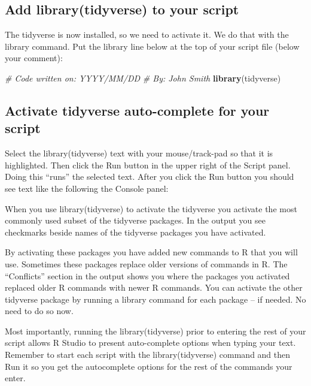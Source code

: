 \documentclass[
]{krantz}
\makeatletter
\newenvironment{Shaded}{\begin{snugshade}}{\end{snugshade}}
\newcommand{\CommentTok}[1]{\textcolor[rgb]{0.37,0.37,0.37}{\textit{#1}}}
\newcommand{\KeywordTok}[1]{\textcolor[rgb]{0.27,0.27,0.27}{\textbf{#1}}}
\newcommand{\NormalTok}[1]{#1}
\newenvironment{kframe}{%
\medskip{}
\setlength{\fboxsep}{.8em}
 \def\at@end@of@kframe{}%
 \ifinner\ifhmode%
  \def\at@end@of@kframe{\end{minipage}}%
  \begin{minipage}{\columnwidth}%
 \fi\fi%
 \def\FrameCommand##1{\hskip\@totalleftmargin \hskip-\fboxsep
 \colorbox{shadecolor}{##1}\hskip-\fboxsep
     \hskip-\linewidth \hskip-\@totalleftmargin \hskip\columnwidth}%
 \MakeFramed {\advance\hsize-\width
   \@totalleftmargin\z@ \linewidth\hsize
   \@setminipage}}%
 {\par\unskip\endMakeFramed%
 \at@end@of@kframe}
\renewenvironment{Shaded}{\begin{kframe}}{\end{kframe}}
\makeatother
\begin{document}
\hypertarget{add-librarytidyverse-to-your-script}{%
\subsection{Add library(tidyverse) to your script}\label{add-librarytidyverse-to-your-script}}

The tidyverse is now installed, so we need to activate it. We do that with the library command. Put the library line below at the top of your script file (below your comment):

\begin{Shaded}
\begin{Highlighting}[]
\CommentTok{# Code written on: YYYY/MM/DD }
\CommentTok{# By: John Smith}
\KeywordTok{library}\NormalTok{(tidyverse)}
\end{Highlighting}
\end{Shaded}

\hypertarget{activate-tidyverse-auto-complete-for-your-script}{%
\subsection{Activate tidyverse auto-complete for your script}\label{activate-tidyverse-auto-complete-for-your-script}}

Select the library(tidyverse) text with your mouse/track-pad so that it is highlighted. Then click the Run button in the upper right of the Script panel. Doing this ``runs'' the selected text. After you click the Run button you should see text like the following the Console panel:

When you use library(tidyverse) to activate the tidyverse you activate the most commonly used subset of the tidyverse packages. In the output you see checkmarks beside names of the tidyverse packages you have activated.

By activating these packages you have added new commands to R that you will use. Sometimes these packages replace older versions of commands in R. The ``Conflicts'' section in the output shows you where the packages you activated replaced older R commands with newer R commands. You can activate the other tidyverse package by running a library command for each package -- if needed. No need to do so now.

Most importantly, running the library(tidyverse) prior to entering the rest of your script allows R Studio to present auto-complete options when typing your text. Remember to start each script with the library(tidyverse) command and then Run it so you get the autocomplete options for the rest of the commands your enter.
\end{document}
